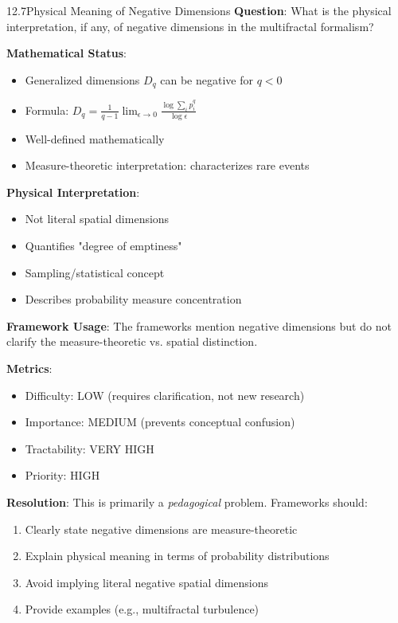 \begin{openproblem}{12.7}{Physical Meaning of Negative Dimensions}
\textbf{Question}: What is the physical interpretation, if any, of negative dimensions in the multifractal formalism?

\textbf{Mathematical Status}:
\begin{itemize}
    \item Generalized dimensions $D_q$ can be negative for $q < 0$
    \item Formula: $D_q = \frac{1}{q-1} \lim_{\epsilon \to 0} \frac{\log \sum_i p_i^q}{\log \epsilon}$
    \item Well-defined mathematically
    \item Measure-theoretic interpretation: characterizes rare events
\end{itemize}

\textbf{Physical Interpretation}:
\begin{itemize}
    \item Not literal spatial dimensions
    \item Quantifies "degree of emptiness"
    \item Sampling/statistical concept
    \item Describes probability measure concentration
\end{itemize}

\textbf{Framework Usage}: The frameworks mention negative dimensions but do not clarify the measure-theoretic vs. spatial distinction.

\textbf{Metrics}:
\begin{itemize}
    \item Difficulty: LOW (requires clarification, not new research)
    \item Importance: MEDIUM (prevents conceptual confusion)
    \item Tractability: VERY HIGH
    \item Priority: HIGH
\end{itemize}

\textbf{Resolution}: This is primarily a \textit{pedagogical} problem. Frameworks should:
\begin{enumerate}
    \item Clearly state negative dimensions are measure-theoretic
    \item Explain physical meaning in terms of probability distributions
    \item Avoid implying literal negative spatial dimensions
    \item Provide examples (e.g., multifractal turbulence)
\end{enumerate}
\end{openproblem}

